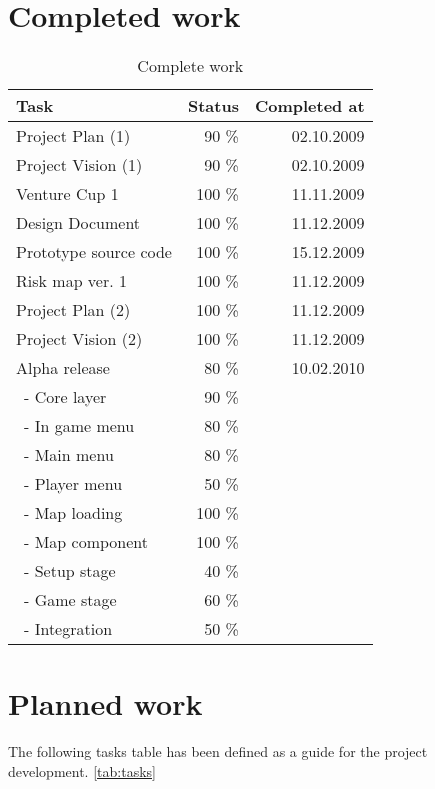 \documentclass[12pt,a4paper]{article}
\begin{document}
\section{Completed work}

\begin{table}[h!]
\small
\begin{tabular}{ l | r | r}
Task					&Status	&Completed at\\\hline\hline
Project Plan (1)			&90 \%	&02.10.2009\\
Project Vision (1)		&90 \%	&02.10.2009\\
Venture Cup 1			&100 \%	&11.11.2009\\
Design Document		&100 \%	&11.12.2009\\
Prototype source code	&100 \%	&15.12.2009\\
Risk map ver. 1			&100 \%	&11.12.2009\\
Project Plan (2)			&100 \%	&11.12.2009\\
Project Vision (2)		&100 \%	&11.12.2009\\
Alpha release			&80 \%	&10.02.2010\\
\ - Core layer			&90 \%	&\\
\ - In game menu		&80 \%	&\\
\ - Main menu			&80 \%	&\\
\ - Player menu			&50 \%	&\\
\ - Map loading			&100 \%	&\\
\ - Map component		&100 \%	&\\
\ - Setup stage			&40 \%	&\\
\ - Game stage			&60 \%	&\\
\ - Integration			&50 \%	&
\end{tabular}
\caption{Complete work}
\label{tab:compwork}
\end{table}

\section{Planned work}

The following tasks table has been defined as a guide for the project development. \ref{tab:tasks}
\end{document}
